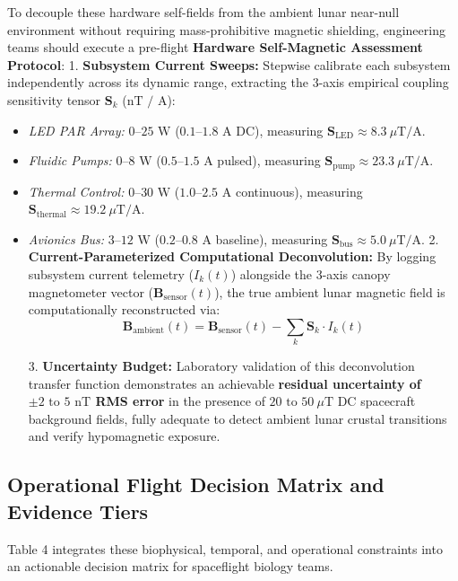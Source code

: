 \documentclass[default,sn-nature,iicol]{sn-jnl}
\begin{document}
To decouple these hardware self-fields from the ambient lunar near-null environment without requiring mass-prohibitive magnetic shielding, engineering teams should execute a pre-flight \textbf{Hardware Self-Magnetic Assessment Protocol}:
1. \textbf{Subsystem Current Sweeps:} Stepwise calibrate each subsystem independently across its dynamic range, extracting the 3-axis empirical coupling sensitivity tensor $\mathbf{S}_k$ ($\text{nT / A}$):
\begin{itemize}
\item \textit{LED PAR Array:} $0\text{--}25\text{ W}$ ($0.1\text{--}1.8\text{ A}$ DC), measuring $\mathbf{S}_{\mathrm{LED}} \approx 8.3\ \mu\text{T/A}$.
\item \textit{Fluidic Pumps:} $0\text{--}8\text{ W}$ ($0.5\text{--}1.5\text{ A}$ pulsed), measuring $\mathbf{S}_{\mathrm{pump}} \approx 23.3\ \mu\text{T/A}$.
\item \textit{Thermal Control:} $0\text{--}30\text{ W}$ ($1.0\text{--}2.5\text{ A}$ continuous), measuring $\mathbf{S}_{\mathrm{thermal}} \approx 19.2\ \mu\text{T/A}$.
\item \textit{Avionics Bus:} $3\text{--}12\text{ W}$ ($0.2\text{--}0.8\text{ A}$ baseline), measuring $\mathbf{S}_{\mathrm{bus}} \approx 5.0\ \mu\text{T/A}$.
2. \textbf{Current-Parameterized Computational Deconvolution:} By logging subsystem current telemetry ($I_k(t)$) alongside the 3-axis canopy magnetometer vector ($\mathbf{B}_{\mathrm{sensor}}(t)$), the true ambient lunar magnetic field is computationally reconstructed via:
\begin{equation}
\mathbf{B}_{\mathrm{ambient}}(t) = \mathbf{B}_{\mathrm{sensor}}(t) - \sum_{k} \mathbf{S}_k \cdot I_k(t)
\end{equation}

3. \textbf{Uncertainty Budget:} Laboratory validation of this deconvolution transfer function demonstrates an achievable \textbf{residual uncertainty of $\pm 2\text{ to }5\text{ nT}$ RMS error} in the presence of $20\text{ to }50\ \mu\text{T}$ DC spacecraft background fields, fully adequate to detect ambient lunar crustal transitions and verify hypomagnetic exposure.
\end{itemize}


\subsection{Operational Flight Decision Matrix and Evidence Tiers}
Table 4 integrates these biophysical, temporal, and operational constraints into an actionable decision matrix for spaceflight biology teams.
\end{document}
